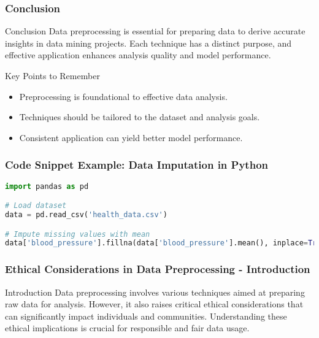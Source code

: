 \documentclass{beamer}
\begin{document}
\begin{frame}[fragile]
    \frametitle{Conclusion}
    \begin{block}{Conclusion}
        Data preprocessing is essential for preparing data to derive accurate insights in data mining projects. Each technique has a distinct purpose, and effective application enhances analysis quality and model performance.
    \end{block}

    \begin{block}{Key Points to Remember}
        \begin{itemize}
            \item Preprocessing is foundational to effective data analysis.
            \item Techniques should be tailored to the dataset and analysis goals.
            \item Consistent application can yield better model performance.
        \end{itemize}
    \end{block}
\end{frame}

\begin{frame}[fragile]
    \frametitle{Code Snippet Example: Data Imputation in Python}
    \begin{lstlisting}[language=Python]
import pandas as pd

# Load dataset
data = pd.read_csv('health_data.csv')

# Impute missing values with mean 
data['blood_pressure'].fillna(data['blood_pressure'].mean(), inplace=True)
    \end{lstlisting}
\end{frame}

\begin{frame}[fragile]
    \frametitle{Ethical Considerations in Data Preprocessing - Introduction}
    \begin{block}{Introduction}
        Data preprocessing involves various techniques aimed at preparing raw data for analysis. However, it also raises critical ethical considerations that can significantly impact individuals and communities. 
        Understanding these ethical implications is crucial for responsible and fair data usage.
    \end{block}
\end{frame}
\end{document}
